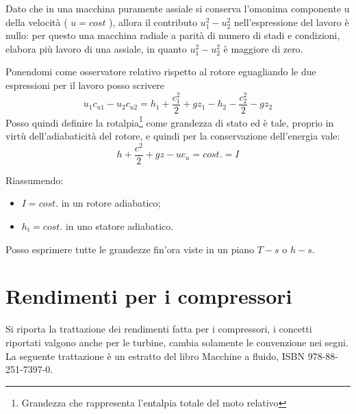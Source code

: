Dato che in una macchina puramente assiale si conserva l'omonima componente u della velocità ( $u = cost$ ), allora il contributo $u_1^2 - u_2^2$ nell'espressione del lavoro è nullo: per questo una macchina radiale a parità di numero di stadi e condizioni, elabora più lavoro di una assiale, in quanto $u_1^2 - u_2^2$ è maggiore di zero.

Ponendomi come osservatore relativo rispetto al rotore eguagliando le due espressioni per il lavoro posso scrivere
\begin{equation}
u_1 c_{u1} - u_2 c_{u2} = h_1 + \frac{c_1^2}{2}+gz_1-h_2-\frac{c_2^2}{2}-gz_2
\end{equation}
Posso quindi definire la rotalpia\footnote{Grandezza che rappresenta l'entalpia totale del moto relativo} come grandezza di stato ed è tale, proprio in virtù dell'adiabaticità del rotore, e quindi per la conservazione dell'energia vale:
\begin{equation}
h+\frac{c^2}{2}+gz-u c_u = cost. = I
\end{equation}

Riassumendo:
\begin{itemize}
\item $I=cost.$ in un rotore adiabatico;
\item $h_t=cost.$ in uno statore adiabatico.
\end{itemize}

Posso esprimere tutte le grandezze fin'ora viste in un piano $T-s$ o $h-s$.

\section{Rendimenti per i compressori}
Si riporta la trattazione dei rendimenti fatta per i compressori, i concetti riportati valgono anche per le turbine, cambia solamente le convenzione nei segni. La seguente trattazione è un estratto del libro Macchine a fluido, ISBN 978-88-251-7397-0. 

